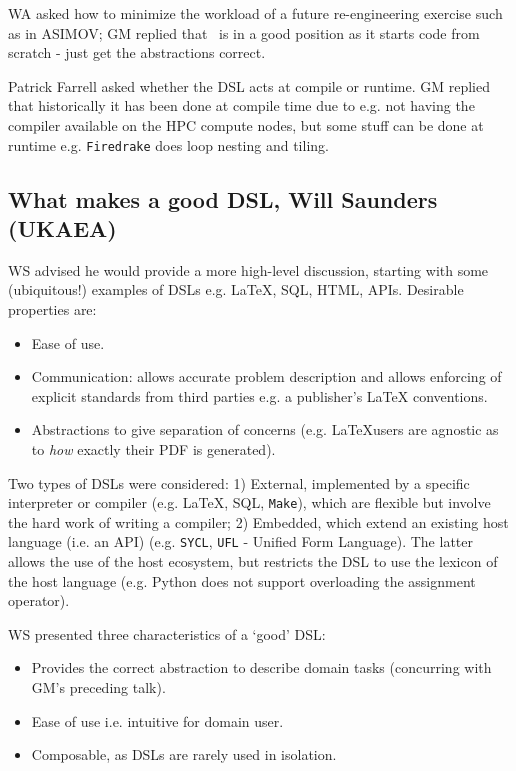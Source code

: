 \documentclass[11pt]{article}
\begin{document}
WA asked how to minimize the workload of a future re-engineering exercise such 
as in ASIMOV; GM replied that \nep\  is in a good position as it starts code 
from scratch - just get the abstractions correct.

Patrick Farrell asked whether the DSL acts at compile or runtime.  GM replied 
that historically it has been done at compile time due to e.g. not having the 
compiler available on the HPC compute nodes, but some stuff can be done at 
runtime e.g. {\tt Firedrake} does loop nesting and tiling.

\subsection{What makes a good DSL, Will Saunders (UKAEA)}

WS advised he would provide a more high-level discussion, starting with some 
(ubiquitous!) examples of DSLs e.g. \LaTeX, SQL, HTML, APIs.  Desirable 
properties are:

\begin{itemize}
\item Ease of use.
\item Communication: allows accurate problem description and allows enforcing 
of explicit standards from third parties e.g. a publisher's \LaTeX 
conventions.
\item Abstractions to give separation of concerns (e.g. \LaTeX users are 
agnostic as to {\it how} exactly their PDF is generated).
\end{itemize} 

Two types of DSLs were considered: 1) External, implemented by a specific 
interpreter or compiler (e.g. \LaTeX, SQL, {\tt Make}), which are flexible 
but involve the hard work of writing a compiler; 2) Embedded, which extend an 
existing host language (i.e. an API) (e.g. {\tt SYCL}, {\tt UFL} - Unified Form 
Language).  The latter allows the use of the host ecosystem, but restricts the 
DSL to use the lexicon of the host language (e.g. Python does not support 
overloading the assignment operator).

WS presented three characteristics of a `good' DSL:

\begin{itemize}
\item Provides the correct abstraction to describe domain tasks (concurring 
with GM's preceding talk).
\item Ease of use i.e. intuitive for domain user.
\item Composable, as DSLs are rarely used in isolation.
\end{itemize}
\end{document}
